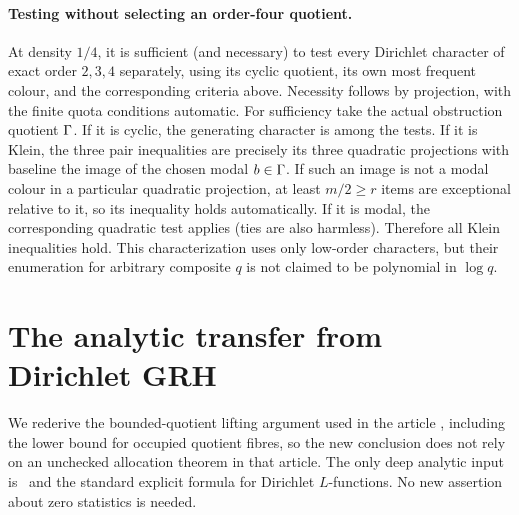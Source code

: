 \documentclass[11pt]{article}
\theoremstyle{remark}\newtheorem{remark}[theorem]{Remark}
\begin{document}
\paragraph{Testing without selecting an order-four quotient.}
At density $1/4$, it is sufficient (and necessary) to test every Dirichlet character of exact order $2,3,4$ separately, using its cyclic quotient, its own most frequent colour, and the corresponding criteria above. Necessity follows by projection, with the finite quota conditions automatic. For sufficiency take the actual obstruction quotient $\Gamma$. If it is cyclic, the generating character is among the tests. If it is Klein, the three pair inequalities are precisely its three quadratic projections with baseline the image of the chosen modal $b\in\Gamma$. If such an image is not a modal colour in a particular quadratic projection, at least $m/2\ge r$ items are exceptional relative to it, so its inequality holds automatically. If it is modal, the corresponding quadratic test applies (ties are also harmless). Therefore all Klein inequalities hold. This characterization uses only low-order characters, but their enumeration for arbitrary composite $q$ is not claimed to be polynomial in $\log q$.

\section{The analytic transfer from Dirichlet GRH}\label{sec:analytic}
We rederive the bounded-quotient lifting argument used in the article \cite{article}, including the lower bound for occupied quotient fibres, so the new conclusion does not rely on an unchecked allocation theorem in that article. The only deep analytic input is \DGRH\ and the standard explicit formula for Dirichlet $L$-functions. No new assertion about zero statistics is needed.
\end{document}
